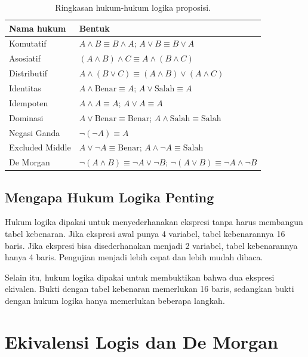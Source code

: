 \documentclass[11pt,a4paper]{article}
\begin{document}
\begin{table}[H]
	\centering
	\caption{Ringkasan hukum-hukum logika proposisi.}
	\label{tab:hukum}
	\small
	\begin{tabularx}{\textwidth}{l X}
		\toprule
		Nama hukum & Bentuk \\
		\midrule
		Komutatif & $A \wedge B \equiv B \wedge A$; $A \vee B \equiv B \vee A$ \\
		Asosiatif & $(A \wedge B) \wedge C \equiv A \wedge (B \wedge C)$ \\
		Distributif & $A \wedge (B \vee C) \equiv (A \wedge B) \vee (A \wedge C)$ \\
		Identitas & $A \wedge \text{Benar} \equiv A$; $A \vee \text{Salah} \equiv A$ \\
		Idempoten & $A \wedge A \equiv A$; $A \vee A \equiv A$ \\
		Dominasi & $A \vee \text{Benar} \equiv \text{Benar}$; $A \wedge \text{Salah} \equiv \text{Salah}$ \\
		Negasi Ganda & $\neg(\neg A) \equiv A$ \\
		Excluded Middle & $A \vee \neg A \equiv \text{Benar}$; $A \wedge \neg A \equiv \text{Salah}$ \\
		De Morgan & $\neg(A \wedge B) \equiv \neg A \vee \neg B$; $\neg(A \vee B) \equiv \neg A \wedge \neg B$ \\
		\bottomrule
	\end{tabularx}
\end{table}

\subsection{Mengapa Hukum Logika Penting}

Hukum logika dipakai untuk menyederhanakan ekspresi tanpa harus membangun tabel kebenaran. Jika ekspresi awal punya 4 variabel, tabel kebenarannya 16 baris. Jika ekspresi bisa disederhanakan menjadi 2 variabel, tabel kebenarannya hanya 4 baris. Pengujian menjadi lebih cepat dan lebih mudah dibaca.

Selain itu, hukum logika dipakai untuk membuktikan bahwa dua ekspresi ekivalen. Bukti dengan tabel kebenaran memerlukan 16 baris, sedangkan bukti dengan hukum logika hanya memerlukan beberapa langkah.

\section{Ekivalensi Logis dan De Morgan}
\label{sec:ekivalensi}
\end{document}
